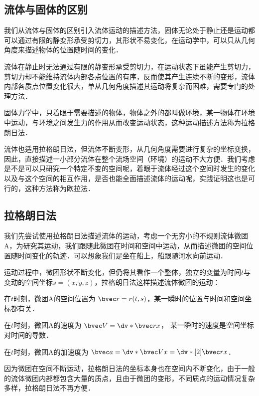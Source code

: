 
\begin{issues}
\issueDraft
{}
\end{issues}

\subsection{流体与固体的区别}
我们从流体与固体的区别引入流体运动的描述方法，固体无论处于静止还是运动都可以通过有限的静变形承受剪切力，其形状不易变化，在运动学中，可以只从几何角度来描述物体的位置随时间的变化．

流体在静止时无法通过有限的静变形承受剪切力，在运动状态下虽能产生剪切力，剪切力却不能维持流体内部各点位置的有序，反而使其产生连续不断的变形，流体内部各质点位置变化很大，单从几何角度描述其运动将复杂而困难，需要专门的处理方法．

固体力学中，只着眼于需要描述的物体，物体之外的都叫做环境，某一物体在环境中运动，与环境之间发生力的作用从而改变运动状态，这种运动描述方法称为拉格朗日法．

流体也适用拉格朗日法，但流体不断变形，从几何角度需要进行复杂的坐标变换，因此，直接描述一小部分流体在整个流场空间（环境）的运动不大方便．我们考虑是不是可以只研究一个特定不变的空间呢，着眼于流体经过这个空间时发生的变化以及与这个空间的相互作用，是否也能全面描述流体的运动呢，实践证明这也是可行的，这种方法称为欧拉法．

\subsection{拉格朗日法}
我们先尝试使用拉格朗日法描述流体的运动，考虑一个无穷小的不规则流体微团A，为研究其运动，我们跟随此微团在时间和空间中运动，从而描述微团的空间位置随时间变化的轨迹．可以想象我们是坐在船上，船跟随河水向前运动．

运动过程中，微团形状不断变化，但仍将其看作一个整体，独立的变量为时间$t$与变动的空间坐标$s=(x,y,z)$，拉格朗日法这样描述流体微团的运动：

在$t$时刻，微团A的空间位置为 $\bvec r=r(t,s)$，某一瞬时的位置与时间和空间坐标都有关．

在$t$时刻，微团A的速度为 $\bvec V=\dv*{\bvec r}{x}$，
某一瞬时的速度是空间坐标对时间的导数．

在$t$时刻，微团A的加速度为 $\bvec a=\dv*{\bvec V}{x}=\dv*[2]{\bvec r}{x}$．

因为微团在空间不断运动，拉格朗日法的坐标本身也在空间内不断变化，由于一般的流体微团内部都包含大量的质点，且由于微团的变形，不同质点的运动情况复杂多样，拉格朗日法不再方便．

